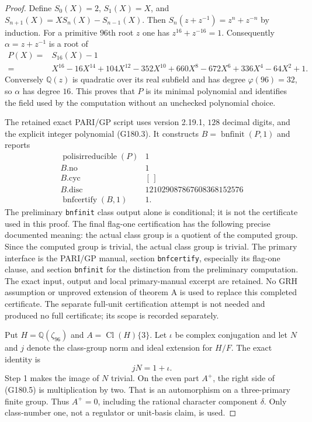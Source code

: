 \begin{proof}
Define $S_0(X)=2$, $S_1(X)=X$, and
$S_{n+1}(X)=XS_n(X)-S_{n-1}(X)$.
Then $S_n(z+z^{-1})=z^n+z^{-n}$ by induction.
For a primitive $96$th root $z$ one has
$z^{16}+z^{-16}=1$.
Consequently $\alpha=z+z^{-1}$ is a root of
\[
 \begin{split}
 P(X)={}&S_{16}(X)-1\\
 ={}&X^{16}-16X^{14}+104X^{12}-352X^{10}
       +660X^8-672X^6+336X^4-64X^2+1.
 \end{split}\tag{G180.3}
\]
Conversely $\mathbb Q(z)$ is quadratic over its real subfield and
has degree $\varphi(96)=32$, so $\alpha$ has degree $16$.
This proves that $P$ is its minimal polynomial and identifies the
field used by the computation without an unchecked polynomial choice.

The retained exact PARI/GP script uses version 2.19.1,
$128$ decimal digits, and the explicit integer polynomial (G180.3).
It constructs $B=\operatorname{bnfinit}(P,1)$ and reports
\[
 \begin{array}{c|c}
 \operatorname{polisirreducible}(P)&1\\
 B.\mathrm{no}&1\\
 B.\mathrm{cyc}&[\,]\\
 B.\mathrm{disc}&121029087867608368152576\\
 \operatorname{bnfcertify}(B,1)&1.
 \end{array}\tag{G180.4}
\]
The preliminary \texttt{bnfinit} class output alone is conditional;
it is not the certificate used in this proof.
The final flag-one certification has the following precise documented
meaning: the actual class group is a quotient of the computed group.
Since the computed group is trivial, the actual class group is trivial.
The primary interface is the PARI/GP manual, section
\texttt{bnfcertify}, especially its flag-one clause, and section
\texttt{bnfinit} for the distinction from the preliminary computation.
The exact input, output and local primary-manual excerpt are retained.
No GRH assumption or unproved extension of theorem A is used to
replace this completed certificate.
The separate full-unit certification attempt is not needed and
produced no full certificate; its scope is recorded separately.

Put $H=\mathbb Q(\zeta_{96})$ and
$A=\operatorname{Cl}(H)\{3\}$.
Let $\iota$ be complex conjugation and let $N$ and $j$ denote
the class-group norm and ideal extension for $H/F$.
The exact identity is
\[
                         jN=1+\iota.
 \tag{G180.5}
\]
Step 1 makes the image of $N$ trivial.  On the even part $A^+$,
the right side of (G180.5) is multiplication by two.
That is an automorphism on a three-primary finite group.
Thus $A^+=0$, including the rational character component $\delta$.
Only class-number one, not a regulator or unit-basis claim, is used.


\end{proof}
